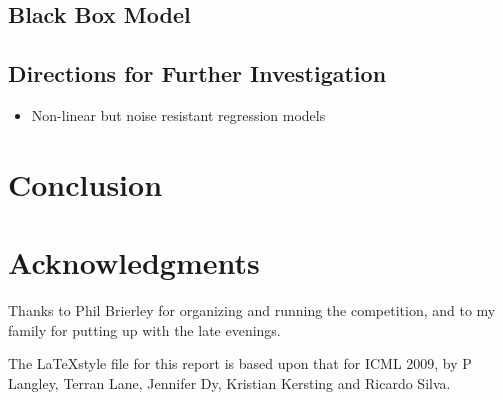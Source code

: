 \documentclass{article}
\begin{document}
\subsection{Black Box Model}


\subsection{}


\subsection{Directions for Further Investigation}

\begin{itemize}
\item Non-linear but noise resistant regression models
\end{itemize}


\section{Conclusion}


\section*{Acknowledgments} 

Thanks to Phil Brierley for organizing and running the competition, and to my family for putting up with the late evenings.

The \LaTeX style file for this report is based upon that for ICML 2009, by P Langley, Terran Lane, Jennifer Dy, Kristian Kersting and Ricardo Silva.




\end{document}
